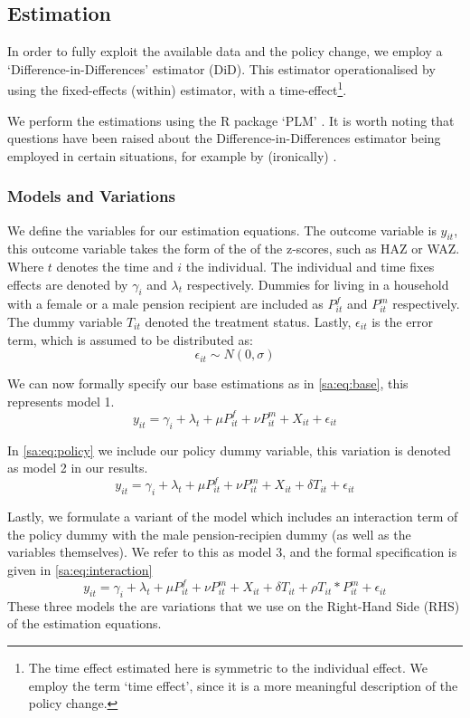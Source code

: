 \begin{refsection}
\subsection{Estimation}
In order to fully exploit the available data and the policy change,
we employ a `Difference-in-Differences' estimator (DiD).
This estimator operationalised by using the fixed-effects (within) estimator, with a time-effect\footnote{The time effect estimated here is symmetric to the individual effect.
We employ the term `time effect', since it is a more meaningful description of the policy change.}.

We perform the estimations using the R package `PLM' \parencite[see][]{croissant2008panel}.
It is worth noting  that questions have been raised about the Difference-in-Differences estimator being employed in certain situations,
for example by (ironically) \textcite{bertrand2004much}.

\subsubsection{Models and Variations}
\label{sa:models}
We define the variables for our estimation equations.
The outcome variable is $y_{it}$, this outcome variable takes the form of the of the z-scores,
such as HAZ or WAZ.
Where $t$ denotes the time and $i$ the individual.
The individual and time fixes effects are denoted by $\gamma_i$ and $\lambda_t$ respectively.
Dummies for living in a household with a female or a male pension recipient are included as $P^f_{it}$ and $P^m_{it}$ respectively.
The dummy variable $T_{it}$ denoted the treatment status.
Lastly, $\epsilon_{it}$ is the error term, which is assumed to be distributed as:
\[
\epsilon_{it} \sim N(0,\sigma)
\]

We can now formally specify our base estimations as in \autoref{sa:eq:base}, this represents model 1.
\begin{equation}
\label{sa:eq:base}
y_{it} = \gamma_i + \lambda_t + \mu P^f_{it} + \nu P^m_{it} + X_{it} + \epsilon_{it}
\end{equation}

In \autoref{sa:eq:policy} we include our policy dummy variable, this variation is denoted as model 2 in our results.
\begin{equation}
\label{sa:eq:policy}
y_{it} = \gamma_i + \lambda_t + \mu P^f_{it} + \nu P^m_{it} + X_{it} + \delta T_{it} + \epsilon_{it}
\end{equation}

Lastly, we formulate a variant of the model which includes an interaction term of the policy dummy with the male pension-recipien dummy
(as well as the variables themselves).
We refer to this as model 3, and the formal specification is given in \autoref{sa:eq:interaction}
\begin{equation}
\label{sa:eq:interaction}
y_{it} = \gamma_i + \lambda_t + \mu P^f_{it} + \nu P^m_{it} + X_{it} + \delta T_{it} + \rho T_{it}*P^m_{it} + \epsilon_{it}
\end{equation}
These three models the are variations that we use on the Right-Hand Side (RHS) of the estimation equations.


\end{refsection}
